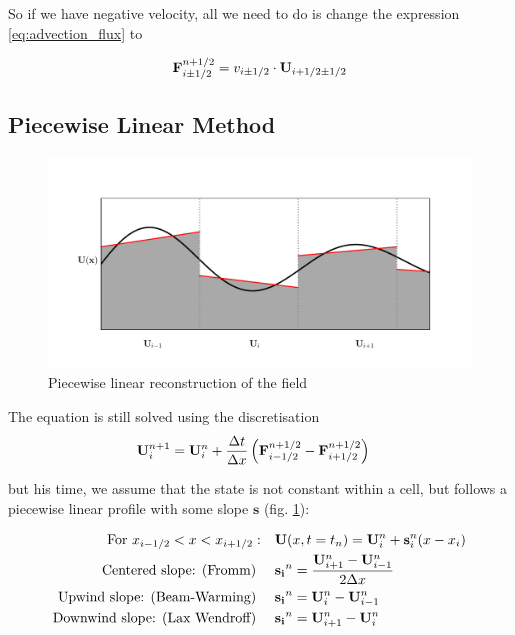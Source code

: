 So if we have negative velocity, all we need to do is change the expression \ref{eq:advection_flux} to

\begin{equation}
	\mathbf{F}_{i\pm1/2}^{n+1/2} = v_{i\pm1/2}\cdot \mathbf{U}_{i + 1/2 \pm 1/2}
\end{equation}

















\subsection{Piecewise Linear Method}

\begin{figure}[htbp]
	\includegraphics[width=\textwidth]{./figures/piecewise_linear.pdf}%
	\caption{Piecewise linear reconstruction of the field
		\label{fig:pwlin}
	}
\end{figure}


The equation is still solved using the discretisation
\begin{align}
	\mathbf{U}_i ^{n+1} &= 
		\mathbf{U}_i^{n} +  \frac{\Delta t}{\Delta x} \left( \mathbf{F}_{i-1/2}^{n+1/2} - \mathbf{F}_{i+1/2}^{n+1/2} \right) \label{eq:advection_basic_pwlin}
\end{align}

but his time, we assume that the state is not constant within a cell, but follows a piecewise linear profile with some slope $\mathbf{s}$ (fig. \ref{fig:pwlin}):

\begin{align*}
	\text{For } x_{i-1/2} < x < x_{i+1/2}: &&
	& \mathbf{U}(x, t=t_n) = \mathbf{U}_i^n + \mathbf{s}_i^n(x - x_i) \\
	\text{Centered slope: (Fromm) } && &\mathbf{s_i}^n = \frac{\mathbf{U}_{i+1}^n - \mathbf{U}_{i-1}^n}{ 2 \Delta x}\\
	\text{Upwind slope: (Beam-Warming) } && &\mathbf{s_i}^n = \mathbf{U}_{i}^n - \mathbf{U}_{i-1}^n \\
	\text{Downwind slope: (Lax Wendroff) } && &\mathbf{s_i}^n = \mathbf{U}_{i+1}^n - \mathbf{U}_{i}^n \\
\end{align*}


